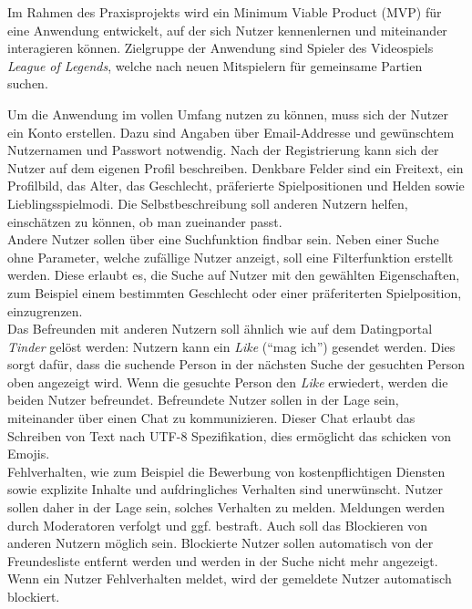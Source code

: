 Im Rahmen des Praxisprojekts wird ein Minimum Viable Product
(MVP) 
für eine Anwendung entwickelt, auf der sich Nutzer kennenlernen und miteinander interagieren können. Zielgruppe der Anwendung sind Spieler des Videospiels \textit{League of Legends}, welche nach neuen Mitspielern für gemeinsame Partien suchen.

Um die Anwendung im vollen Umfang nutzen zu können, muss sich der Nutzer ein Konto erstellen.
Dazu sind Angaben über Email-Addresse und gewünschtem Nutzernamen und Passwort notwendig.
Nach der Registrierung kann sich der Nutzer auf dem eigenen Profil beschreiben.
Denkbare Felder sind ein Freitext, ein Profilbild, das Alter, das Geschlecht, präferierte Spielpositionen und Helden sowie Lieblingsspielmodi.
Die Selbstbeschreibung soll anderen Nutzern helfen, einschätzen zu können, ob man zueinander passt.\\

Andere Nutzer sollen über eine Suchfunktion findbar sein.
Neben einer Suche ohne Parameter, welche zufällige Nutzer anzeigt, soll eine Filterfunktion erstellt werden.
Diese erlaubt es, die Suche auf Nutzer mit den gewählten Eigenschaften, zum Beispiel einem bestimmten Geschlecht oder einer präferiterten Spielposition, einzugrenzen. \\

Das Befreunden mit anderen Nutzern soll ähnlich wie auf dem Datingportal \textit{Tinder} gelöst werden: Nutzern kann ein \textit{Like} (\enquote{mag ich}) gesendet werden.
Dies sorgt dafür, dass die suchende Person in der nächsten Suche der gesuchten Person oben angezeigt wird.
Wenn die gesuchte Person den \textit{Like} erwiedert, werden die beiden Nutzer befreundet.
Befreundete Nutzer sollen in der Lage sein, miteinander über einen Chat zu kommunizieren.
Dieser Chat erlaubt das Schreiben von Text nach UTF-8 Spezifikation,
dies ermöglicht das schicken von Emojis.\\

Fehlverhalten, wie zum Beispiel die Bewerbung von kostenpflichtigen Diensten sowie explizite Inhalte und aufdringliches Verhalten sind unerwünscht.
Nutzer sollen daher in der Lage sein, solches Verhalten zu melden.
Meldungen werden durch Moderatoren verfolgt und ggf. bestraft.
Auch soll das Blockieren von anderen Nutzern möglich sein.
Blockierte Nutzer sollen automatisch von der Freundesliste entfernt werden und werden in der Suche nicht mehr angezeigt.
Wenn ein Nutzer Fehlverhalten meldet, wird der gemeldete Nutzer automatisch blockiert.\\

